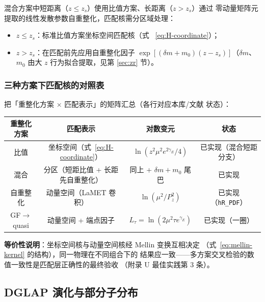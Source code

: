 \documentclass[11pt,a4paper]{ctexart}
\newcommand{\code}[1]{\texttt{#1}}
\begin{document}
混合方案中短距离（$z\le z_s$）使用比值方案、长距离（$z>z_s$）通过
零动量矩阵元提取的线性发散参数自重整化，匹配核需分区域处理：
\begin{itemize}
  \item $z \le z_s$：标准比值方案坐标空间匹配核（式
  ~\eqref{eq:H-coordinate}）；
  \item $z > z_s$：在匹配前先应用自重整化因子
  $\exp[(\delta m + m_0)(z - z_s)]$（$\delta m$、$m_0$ 由大 $z$
  行为拟合提取，见第 \ref{sec:zr} 节）。
\end{itemize}

\subsubsection{三种方案下匹配核的对照表}

把「重整化方案 $\times$ 匹配表示」的矩阵汇总（各行对应本库/文献
状态）：

\begin{center}
\small
\begin{tabular}{c c c c}
\toprule
\textbf{重整化方案} & \textbf{匹配表示} & \textbf{对数变元} &
\textbf{状态} \\
\midrule
比值 & 坐标空间（式~\eqref{eq:H-coordinate}） &
$\ln(z^2\mu^2e^{2\gamma_E}/4)$ & 已实现（混合短距分支） \\
混合 & 分区（短距比值 + 长距先自重整化） & 同上 + $\delta m+m_0$
尾巴 & 已实现 \\
自重整化 & 动量空间（LaMET 卷积） & $\ln(\mu^2/P_z^2)$ &
已实现（\code{hR\_PDF}） \\
GF$\to$quasi & 动量空间 + 端点因子 & $L_\tau=\ln(2\mu^2\tau
e^{\gamma_E})$ & 已实现（一圈） \\
\bottomrule
\end{tabular}
\end{center}
\textbf{等价性说明}：坐标空间核与动量空间核经 Mellin 变换互相决定
（式~\eqref{eq:mellin-kernel} 的结构），同一物理在不同组合下的
结果应一致——多方案交叉检验的数值一致性是匹配层正确性的最终验收
（附录 U 最佳实践第 3 条）。

\subsection{DGLAP 演化与部分子分布}
\end{document}
